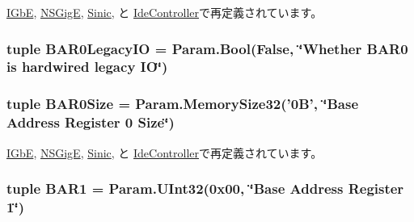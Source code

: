 \hyperlink{classEthernet_1_1IGbE_aa4b1656989a2151c14fc1d464df6531c}{IGbE}, \hyperlink{classEthernet_1_1NSGigE_aa4b1656989a2151c14fc1d464df6531c}{NSGigE}, \hyperlink{classEthernet_1_1Sinic_aa4b1656989a2151c14fc1d464df6531c}{Sinic}, と \hyperlink{classIde_1_1IdeController_aa4b1656989a2151c14fc1d464df6531c}{IdeController}で再定義されています。\hypertarget{classPci_1_1PciDevice_a32603a049ed92aee1ac0903a3290de9a}{
\subsubsection[{BAR0LegacyIO}]{\setlength{\rightskip}{0pt plus 5cm}tuple {\bf BAR0LegacyIO} = Param.Bool(False, \char`\"{}Whether {\bf BAR0} is hardwired legacy IO\char`\"{})}}
\label{classPci_1_1PciDevice_a32603a049ed92aee1ac0903a3290de9a}
\hypertarget{classPci_1_1PciDevice_a7e828d882d67741a4bb003f243f67930}{
\subsubsection[{BAR0Size}]{\setlength{\rightskip}{0pt plus 5cm}tuple {\bf BAR0Size} = Param.MemorySize32('0B', \char`\"{}Base Address Register 0 Size\char`\"{})}}
\label{classPci_1_1PciDevice_a7e828d882d67741a4bb003f243f67930}


\hyperlink{classEthernet_1_1IGbE_aefc407ca01c833e5dac341709110c5e2}{IGbE}, \hyperlink{classEthernet_1_1NSGigE_aefc407ca01c833e5dac341709110c5e2}{NSGigE}, \hyperlink{classEthernet_1_1Sinic_aefc407ca01c833e5dac341709110c5e2}{Sinic}, と \hyperlink{classIde_1_1IdeController_aefc407ca01c833e5dac341709110c5e2}{IdeController}で再定義されています。\hypertarget{classPci_1_1PciDevice_ac14577636d310ffbce9d3e1c55071930}{
\subsubsection[{BAR1}]{\setlength{\rightskip}{0pt plus 5cm}tuple {\bf BAR1} = Param.UInt32(0x00, \char`\"{}Base Address Register 1\char`\"{})}}
\label{classPci_1_1PciDevice_ac14577636d310ffbce9d3e1c55071930}



